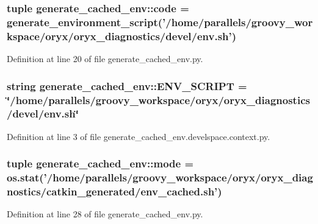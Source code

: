 \subsubsection[{code}]{\setlength{\rightskip}{0pt plus 5cm}tuple {\bf generate\-\_\-cached\-\_\-env\-::code} = generate\-\_\-environment\-\_\-script('/home/parallels/groovy\-\_\-workspace/oryx/oryx\-\_\-diagnostics/devel/env.\-sh')}\label{namespacegenerate__cached__env_ac9bcc622d7ed9c3f04f958d98feb15a2}


\-Definition at line 20 of file generate\-\_\-cached\-\_\-env.\-py.

\subsubsection[{\-E\-N\-V\-\_\-\-S\-C\-R\-I\-P\-T}]{\setlength{\rightskip}{0pt plus 5cm}string {\bf generate\-\_\-cached\-\_\-env\-::\-E\-N\-V\-\_\-\-S\-C\-R\-I\-P\-T} = \char`\"{}/home/parallels/groovy\-\_\-workspace/oryx/oryx\-\_\-diagnostics/devel/env.\-sh\char`\"{}}\label{namespacegenerate__cached__env_a47f2ffa8bf91a11f8c1a26fd677ae040}


\-Definition at line 3 of file generate\-\_\-cached\-\_\-env.\-develspace.\-context.\-py.

\subsubsection[{mode}]{\setlength{\rightskip}{0pt plus 5cm}tuple {\bf generate\-\_\-cached\-\_\-env\-::mode} = os.\-stat('/home/parallels/groovy\-\_\-workspace/oryx/oryx\-\_\-diagnostics/catkin\-\_\-generated/env\-\_\-cached.\-sh')}\label{namespacegenerate__cached__env_a5d4820d9a2d43523818b8013aba84965}


\-Definition at line 28 of file generate\-\_\-cached\-\_\-env.\-py.

